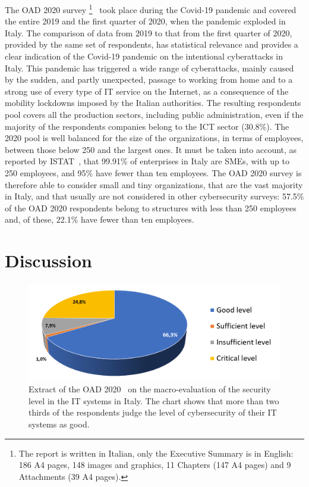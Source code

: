 \documentclass{easychair}
\begin{document}
The OAD 2020 survey
\footnote{The report is written in Italian,
  only the Executive Summary is in English: 186 A4 pages, 148 images and graphics, 11 Chapters
  (147 A4 pages) and 9 Attachments (39 A4 pages).}~\cite{oad20}
took place during the
Covid-19 pandemic and covered the entire 2019 and the first quarter 
of 2020, when the pandemic exploded in Italy. The comparison of data from 2019 to that
from the first quarter of 2020, provided by the same set of respondents,
has statistical relevance and provides a 
clear indication of the Covid-19 pandemic on the intentional cyberattacks in Italy.
This pandemic has triggered a wide range of cyberattacks, mainly 
caused by the sudden, and partly unexpected, passage to working from home
and to a strong use of every type of IT service on the Internet, as a consequence
of the mobility lockdowns imposed by the Italian authorities. The resulting respondents pool
covers all the production sectors, including public administration,
even if the majority of the respondents companies belong to the ICT sector (30.8\%).
The 2020 pool is well balanced for the size of the organizations, in terms
of employees, between those below 250 and the largest ones. It must be taken into account,
as reported by ISTAT~\cite{istat21}, that 99.91\%
of enterprises in Italy are SMEs, with up to 250 employees, and 95\% have fewer than ten employees.
The OAD 2020 survey is therefore able to consider small and 
tiny organizations, that are the vast majority in Italy, and that usually
are not considered in other cybersecurity surveys: 57.5\% of the OAD 2020 respondents
belong to structures with less than 250 employees and, of these, 22.1\% have fewer than ten
employees. 

\section{Discussion}\label{sec:DataDiscussion}

\begin{figure}
	\centering
		\includegraphics[width=1\textwidth]{pictures/fig1.png}
		\caption{Extract of the OAD 2020~\cite{oad20} on the macro-evaluation
                  of the security level in the IT systems in Italy.
                  The chart shows that more than two thirds of the respondents
                  judge the level of cybersecurity of their IT systems as good.}
		\label{fig:1}
\end{figure}
\end{document}
